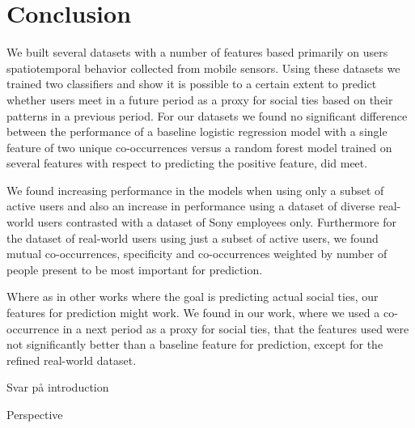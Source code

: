 \chapter{Conclusion}
\label{chap:conclusion}
We built several datasets with a number of features based primarily on users spatiotemporal behavior collected from mobile sensors. Using these datasets we trained two classifiers and show it is possible to a certain extent to predict whether users meet in a future period as a proxy for social ties based on their patterns in a previous period. For our datasets we found no significant difference between the performance of a baseline logistic regression model with a single feature of two unique co-occurrences versus a random forest model trained on several features with respect to predicting the positive feature, did meet.

We found increasing performance in the models when using only a subset of active users and also an increase in performance using a dataset of diverse real-world users contrasted with a dataset of Sony employees only. Furthermore for the dataset of real-world users using just a subset of active users, we found mutual co-occurrences, specificity and co-occurrences weighted by number of people present to be most important for prediction.

Where as in other works where the goal is predicting actual social ties, our features for prediction might work. We found in our work, where we used a co-occurrence in a next period as a proxy for social ties, that the features used were not significantly better than a baseline feature for prediction, except for the refined real-world dataset.

Svar på introduction
 
Perspective

